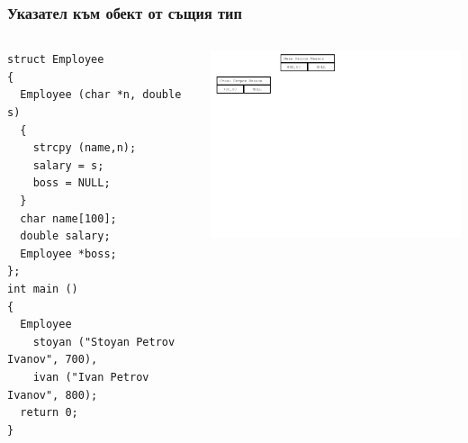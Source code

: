 \documentclass{beamer}
\begin{document}
\begin{frame}[fragile]
\frametitle{Указател към обект от същия тип}

\begin{columns}[c]
  \begin{column}{0.55\textwidth}
\begin{flushleft}
\begin{lstlisting}
struct Employee
{
  Employee (char *n, double s)
  {
    strcpy (name,n);
    salary = s;
    boss = NULL;
  }
  char name[100];
  double salary;
  Employee *boss;
};
int main ()
{
  Employee 
    stoyan ("Stoyan Petrov Ivanov", 700),
    ivan ("Ivan Petrov Ivanov", 800);
  return 0;
}

\end{lstlisting}  
\end{flushleft}

  \end{column}
  \begin{column}{0.45\textwidth}
\hspace{-100px}
\includegraphics[width=10.5cm]{images/00_rec_obj_two_objects_unlinked}

  \end{column}
\end{columns}
\end{frame}
\end{document}
